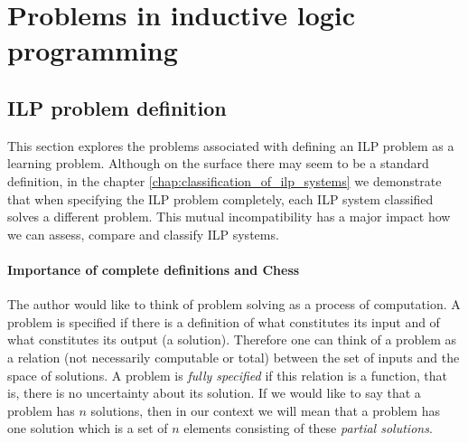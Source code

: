\chapter{Problems in inductive logic programming}

\section{ILP problem definition}
This section explores the problems associated with defining an ILP problem as a learning problem. Although on the surface there may seem to be a standard definition, in the chapter \ref{chap:classification_of_ilp_systems} we demonstrate that when specifying the ILP problem completely, each ILP system classified solves a different problem. This mutual incompatibility has a major impact how we can assess, compare and classify ILP systems.

\subsubsection{Importance of complete definitions and Chess}
The author would like to think of problem solving as a process of computation. A problem is specified if there is a definition of what constitutes its input and of what constitutes its output (a solution). Therefore one can think of a problem as a relation (not necessarily computable or total) between the set of inputs and the space of solutions. A problem is \emph{fully specified} if this relation is a function, that is, there is no uncertainty about its solution. If we would like to say that a problem has $n$ solutions, then in our context we will mean that a problem has one solution which is a set of $n$ elements consisting of these \emph{partial solutions}.

